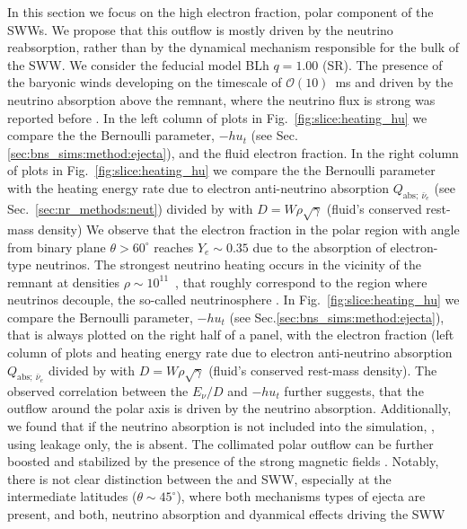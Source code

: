 In this section we focus on the high electron fraction, polar component of the 
\acp{SWW}. We propose that this outflow is mostly driven by the neutrino 
reabsorption, rather than by the dynamical mechanism responsible for the bulk of the 
\ac{SWW}. We consider the feducial model BLh $q=1.00$ (SR). 
%
The presence of the baryonic winds developing on the timescale of $\mathcal{O}(10)$~ms
and driven by the neutrino absorption above the remnant, where the neutrino flux is strong 
was reported before \citep[\eg][]{Perego:2014fma}. 
%
In the left column of plots in Fig.~\ref{fig:slice:heating_hu} we compare 
the the Bernoulli parameter, $-hu_t$ (see Sec.\ref{sec:bns_sims:method:ejecta}), and the fluid 
electron fraction. 
%
In the right column of plots in Fig.~\ref{fig:slice:heating_hu} we compare 
the the Bernoulli parameter with the heating energy rate due to electron anti-neutrino absorption 
$Q_{\text{abs};\:\bar{\nu}_e}$ (see Sec.~\ref{sec:nr_methods:neut}) divided by with 
$D=W\rho\sqrt{\gamma}$ (fluid's conserved rest-mass density)
We observe that the electron fraction in the polar region with angle 
from binary plane $\theta>60^{\circ}$ reaches $Y_e\sim0.35$ due to the absorption of 
electron-type neutrinos.
The strongest neutrino heating occurs in the vicinity of the remnant at densities 
$\rho\sim10^{11}$~\gcm, that roughly correspond to the region where neutrinos decouple,
the so-called neutrinosphere \citep{Endrizzi:2019trv}.
%
In Fig.~\ref{fig:slice:heating_hu} we compare the Bernoulli parameter, 
$-hu_t$ (see Sec.\ref{sec:bns_sims:method:ejecta}), that is always plotted 
on the right half of a panel, with the electron fraction (left 
column of plots and heating energy rate due to electron anti-neutrino absorption 
$Q_{\text{abs};\:\bar{\nu}_e}$ divided by with $D=W\rho\sqrt{\gamma}$ 
(fluid's conserved rest-mass density).
The observed correlation between the $E_\nu/D$  and $-h u_t$ further suggests, 
that the outflow around the polar axis is driven by the neutrino absorption. 
Additionally, we found that if the neutrino absorption is not included into the 
simulation, \eg, using leakage only, the \nwind{} is absent. 
%
The collimated polar outflow can be further boosted and stabilized by the presence of the 
strong magnetic fields \citep{Bucciantini:2011kx,Ciolfi:2020hgg,Mosta:2020hlh}.
%
Notably, there is not clear distinction between the \nwind{} and \ac{SWW}, especially 
at the intermediate latitudes ($\theta \sim 45^{\circ}$), where both mechanisms types of 
ejecta are present, and both, neutrino absorption and dyanmical effects driving the \ac{SWW} 
